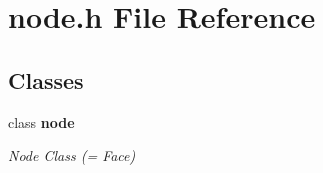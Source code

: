 \section{node.\-h File Reference}
\label{node_8h}
\subsection*{Classes}
\begin{DoxyCompactItemize}
\item 
class {\bf node}
\begin{DoxyCompactList}\small\item\em Node Class (= Face) \end{DoxyCompactList}\end{DoxyCompactItemize}
